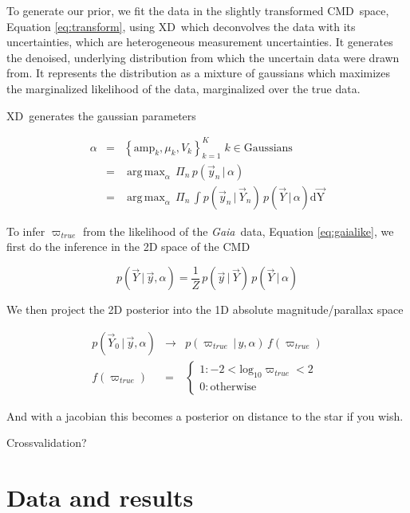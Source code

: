 \documentclass[modern]{aastex61}
\newcommand{\acronym}[1]{{\small{#1}}}
\newcommand{\project}[1]{\textsl{#1}}
\newcommand{\gaia}{\project{Gaia}}
\newcommand{\xd}{\acronym{XD}}
\newcommand{\cmd}{\acronym{CMD}}
\newcommand{\given}{\,|\,}
\DeclareMathOperator*{\argmax}{arg\,max}
\begin{document}
To generate our prior, we fit the data in the slightly transformed \cmd\ space, Equation \ref{eq:transform}, using \xd\ which deconvolves the data with its uncertainties, which are heterogeneous measurement uncertainties. It generates the denoised, underlying distribution from which the uncertain data were drawn from. It represents the distribution as a mixture of gaussians which maximizes the marginalized likelihood of the data, marginalized over the true data.

\xd\ generates the gaussian parameters

\begin{eqnarray}
\alpha &=& \left\{\mathrm{amp}_k, \mu_k, V_k\right\}_{k=1}^K \; k \in \mathrm{Gaussians} \nonumber\\
       &=& \argmax_{\alpha} \, \Pi_n \, p(\vec{y}_n \given \alpha) \nonumber\\
       &=& \argmax_{\alpha} \, \Pi_n \, \int p(\vec{y}_n \given \vec{Y}_n) \, p(\vec{Y} \given \alpha)\mathrm{d\vec{Y}}
\label{eq:xdmml}
\end{eqnarray}

To infer $\varpi_{true}$ from the likelihood of the \gaia\ data, Equation \ref{eq:gaialike}, we first do the inference in the 2D space of the \cmd

\begin{equation}
p(\vec{Y} \given \vec{y}, \alpha) = \frac{1}{Z} \, p(\vec{y} \given \vec{Y}) \, p(\vec{Y} \given \alpha)
\label{eq:posterior}
\end{equation}

We then project the 2D posterior into the 1D absolute magnitude/parallax space

\begin{eqnarray}
p(\vec{Y}_0 \given \vec{y}, \alpha) &\rightarrow& p(\varpi_{true} \given y, \alpha) \, f(\varpi_{true}) \\
f(\varpi_{true}) &=& \begin{cases}
              1: -2 < \mathrm{log}_{10} \varpi_{true} < 2\\
              0: \mathrm{otherwise}
              \end{cases}
\label{eq:parallaxPost}
\end{eqnarray}

And with a jacobian this becomes a posterior on distance to the star if you wish.

Crossvalidation?

\section{Data and results}
\end{document}
